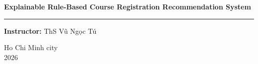 \begin{titlepage}
\begin{center}
    \vspace{0.5cm}
    \parbox{13cm}{\centering\fontsize{17pt}{21pt}\selectfont\bfseries Explainable Rule-Based Course Registration Recommendation System}

    \vspace{0.5cm}
    \rule{13cm}{0.8pt}

    \vspace{0.7cm}
    \renewcommand{\arraystretch}{1.3}
    \textbf{Instructor:} ThS Vũ Ngọc Tú \\

    \vspace{0.6cm}
    \fontsize{12pt}{15pt}\selectfont

\end{center}

\vfill

\begin{center}
    {\fontsize{14pt}{17pt}\selectfont Ho Chi Minh city\\
    2026}
\end{center}

\end{titlepage}